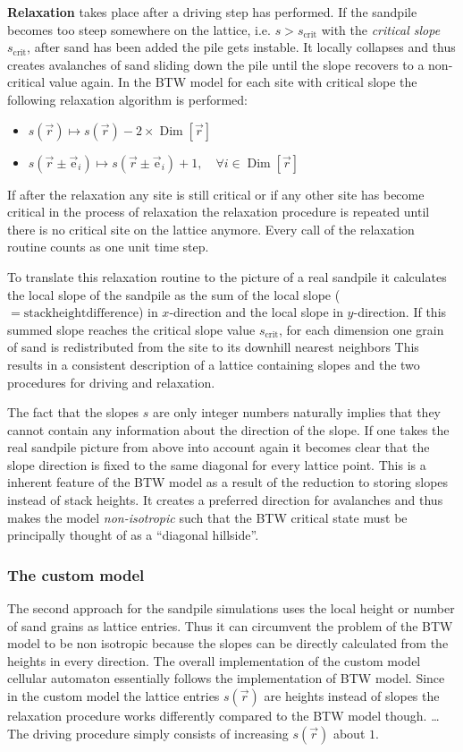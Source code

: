 \textbf{Relaxation} takes place after a driving step has performed. If the sandpile becomes too steep somewhere on the
lattice, i.e. $s > s_{\mathrm{crit}}$ with the \emph{critical slope} $s_{\mathrm{crit}}$, after sand has been added
the pile gets instable. It locally collapses and thus creates avalanches of sand sliding down the pile until the slope
recovers to a non-critical value again. In the BTW model for each site with critical slope the following relaxation
algorithm is performed:
\begin{itemize}
\item $s(\vec{r}) \mapsto s(\vec{r}) - 2\times\operatorname{Dim}\left[\vec{r}\right]$
\item $s(\vec{r}\pm\vec{\mathrm{e}}_i) \mapsto s(\vec{r}\pm\vec{\mathrm{e}}_i) + 1,
\quad \forall i\in\operatorname{Dim}\left[\vec{r}\right]$
\end{itemize}
If after the relaxation any site is still critical or if any other site has become critical in the process of
relaxation the relaxation procedure is repeated until there is no critical site on the lattice anymore.
Every call of the relaxation routine counts as one unit time step.

To translate this relaxation routine to the picture of a real sandpile it calculates the local slope of the sandpile as
the sum of the local slope ($=\mathrm{stack height difference}$) in $x$-direction and the local slope in $y$-direction.
If this summed slope reaches the critical slope value $s_{\mathrm{crit}}$, for each dimension one grain of sand is
redistributed from the site to its downhill nearest neighbors This results in a consistent description of a lattice
containing slopes and the two procedures for driving and relaxation.

The fact that the slopes $s$ are only integer numbers naturally implies that they cannot contain any information about
the direction of the slope. If one takes the real sandpile picture from above into account again it becomes clear that
the slope direction is fixed to the same diagonal for every lattice point. This is a inherent feature of the BTW model
as a result of the reduction to storing slopes instead of stack heights. It creates a preferred direction for avalanches
and thus makes the model \emph{non-isotropic} such that the BTW critical state must be principally thought of as a
\enquote{diagonal hillside}.

\subsubsection{The custom model}
The second approach for the sandpile simulations uses the local height or number of sand grains as lattice entries.
Thus it can circumvent the problem of the BTW model to be non isotropic because the slopes can be directly calculated
from the heights in every direction.
The overall implementation of the custom model cellular automaton essentially follows the implementation of BTW model.
Since in the custom model the lattice entries $s(\vec{r})$ are heights instead of slopes the relaxation procedure
works differently compared to the BTW model though. \dots
The driving procedure simply consists of increasing $s(\vec{r})$ about $1$.

